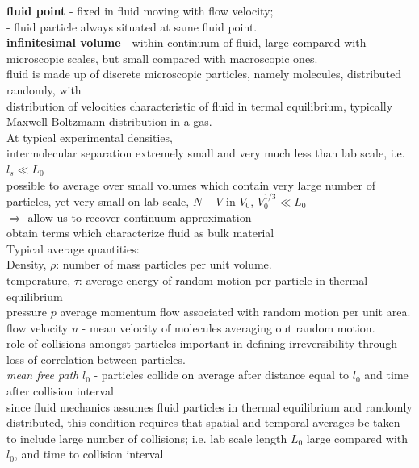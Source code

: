 \documentclass[10pt]{amsart}
\begin{document}
\begin{multicols*}{2}
\textbf{fluid point} - fixed in fluid moving with flow velocity; \\
- fluid particle always situated at same fluid point. \\

\textbf{infinitesimal volume} - within continuum of fluid, large compared with microscopic scales, but small compared with macroscopic ones. \\

fluid is made up of discrete microscopic particles, namely molecules, distributed randomly, with \\
distribution of velocities characteristic of fluid in termal equilibrium, typically Maxwell-Boltzmann distribution in a gas. \\

At typical experimental densities, \\
intermolecular separation extremely small and very much less than lab scale, i.e. $l_s \ll L_0$ \\
possible to average over small volumes which contain very large number of particles, yet very small on lab scale, $N-V$ in $V_0$, $V_0^{1/3} \ll L_0$ \\
$\Longrightarrow$ allow us to recover continuum approximation \\
obtain terms which characterize fluid as bulk material \\

Typical average quantities: \\
Density, $\rho$: number of mass particles per unit volume. \\
temperature, $\tau$: average energy of random motion per particle in thermal equilibrium \\
pressure $p$ average momentum flow associated with random motion per unit area. \\
flow velocity $u$ - mean velocity of molecules averaging out random motion. \\

role of collisions amongst particles important in defining irreversibility through loss of correlation between particles. \\

\emph{mean free path} $l_0$ - particles collide on average after distance equal to $l_0$ and time after collision interval\\

since fluid mechanics assumes fluid particles in thermal equilibrium and randomly distributed, this condition requires that spatial and temporal averages be taken to include large number of collisions; i.e. lab scale length $L_0$ large compared with $l_0$, and time to collision interval \\


\end{multicols*}
\end{document}

